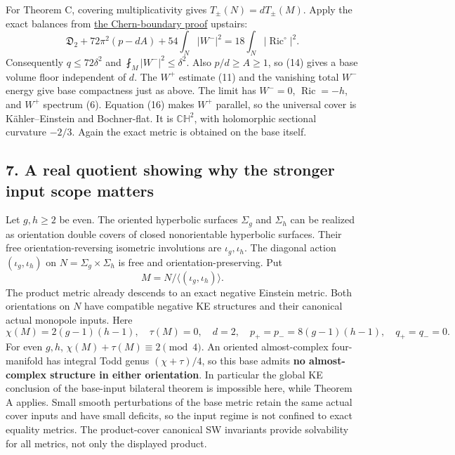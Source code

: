 \documentclass[
  11pt,
]{article}
\begin{document}
For Theorem C, covering multiplicativity gives \(T_\pm(N)=dT_\pm(M)\).
Apply the exact balances from
\href{20260924_chern_boundary_realization.md}{the Chern-boundary proof}
upstairs: \[
 \mathfrak D_2+72\pi^2(p-dA)+54\int_N|W^-|^2
                                  =18\int_N|\operatorname{Ric}^{\circ}|^2.
 \tag{17}
\] Consequently \(q\le72\delta^2\) and \(\fint_M|W^-|^2\le\delta^2\).
Also \(p/d\ge A\ge1\), so (14) gives a base volume floor independent of
\(d\). The \(W^+\) estimate (11) and the vanishing total \(W^-\) energy
give base compactness just as above. The limit has \(W^-=0\),
\(\operatorname{Ric}=-h\), and \(W^+\) spectrum (6). Equation (16) makes
\(W^+\) parallel, so the universal cover is Kähler--Einstein and
Bochner-flat. It is \(\mathbb{CH}^2\), with holomorphic sectional
curvature \(-2/3\). Again the exact metric is obtained on the base
itself.

\hypertarget{a-real-quotient-showing-why-the-stronger-input-scope-matters}{%
\subsection{7. A real quotient showing why the stronger input scope
matters}\label{a-real-quotient-showing-why-the-stronger-input-scope-matters}}

Let \(g,h\ge2\) be even. The oriented hyperbolic surfaces \(\Sigma_g\)
and \(\Sigma_h\) can be realized as orientation double covers of closed
nonorientable hyperbolic surfaces. Their free orientation-reversing
isometric involutions are \(\iota_g,\iota_h\). The diagonal action
\((\iota_g,\iota_h)\) on \(N=\Sigma_g\times\Sigma_h\) is free and
orientation-preserving. Put \[
                M=N/\langle(\iota_g,\iota_h)\rangle.
 \tag{18}
\] The product metric already descends to an exact negative Einstein
metric. Both orientations on \(N\) have compatible negative KE
structures and their canonical actual monopole inputs. Here \[
 \chi(M)=2(g-1)(h-1),\quad \tau(M)=0,\quad
 d=2,\quad p_+=p_-=8(g-1)(h-1),\quad q_+=q_-=0.
 \tag{19}
\] For even \(g,h\), \(\chi(M)+\tau(M)\equiv2\pmod4\). An oriented
almost-complex four-manifold has integral Todd genus \((\chi+\tau)/4\),
so this base admits \textbf{no almost-complex structure in either
orientation}. In particular the global KE conclusion of the base-input
bilateral theorem is impossible here, while Theorem A applies. Small
smooth perturbations of the base metric retain the same actual cover
inputs and have small deficits, so the input regime is not confined to
exact equality metrics. The product-cover canonical SW invariants
provide solvability for all metrics, not only the displayed product.
\end{document}
